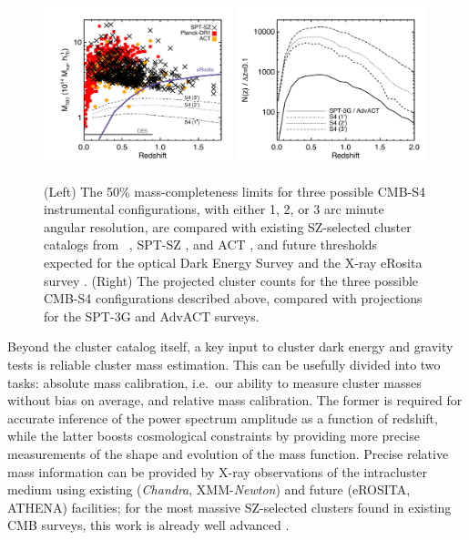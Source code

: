 \begin{figure}[t]
\begin{center}
\includegraphics[width=0.49\textwidth]{DarkEnergy/mass_vs_z_s4.pdf}
\includegraphics[width=0.49\textwidth]{DarkEnergy/dndz_s4.pdf}
\caption{(Left) The 50\% mass-completeness limits for three possible CMB-S4 instrumental configurations, with either 1, 2, or 3 arc minute angular resolution, are compared with existing SZ-selected cluster catalogs from \planck\ \cite{Ade:2015mva}, SPT-SZ \cite{Bleem:2014iim}, and ACT \cite{Hasselfield:2013wf}, and future thresholds expected for the optical Dark Energy Survey and the X-ray eRosita survey \cite{Pillepich:2011zz}.  (Right) The projected cluster counts for the three possible CMB-S4 configurations described above, compared with projections for the SPT-3G \cite{Benson:2014qhw} and AdvACT surveys.}
\label{fig:cluster_counts}
\end{center}
\end{figure} 

Beyond the cluster catalog itself, a key input to cluster dark energy and gravity tests is reliable cluster mass estimation. This can be usefully divided into two tasks: absolute mass calibration, i.e.\ our ability to measure cluster masses without bias on average, and relative mass calibration. The former is required for accurate inference of the power spectrum amplitude as a function of redshift, while the latter boosts cosmological constraints by providing more precise measurements of the shape and evolution of the mass function.  Precise relative mass information can be provided by X-ray observations of the intracluster medium using existing ({\it Chandra}, XMM-{\it Newton}) and future (eROSITA, ATHENA) facilities; for the most massive SZ-selected clusters found in existing CMB surveys, this work is already well advanced \cite{deHaan:2016qvy, Andersson:2010vy}. 

